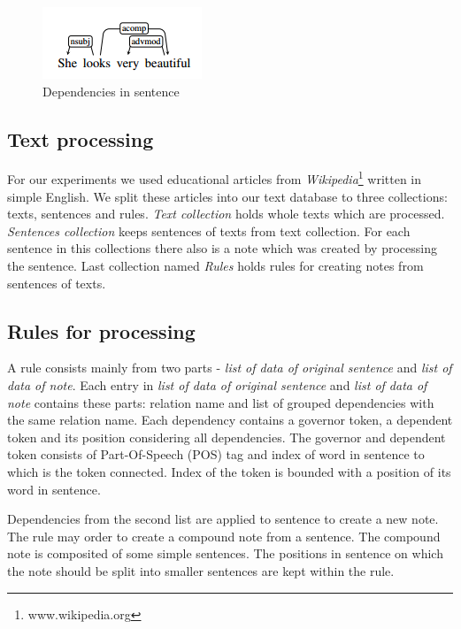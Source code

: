 \documentclass{iitsrc}
\begin{document}
		\begin{figure}[h]
			\begin{center}
				\includegraphics[scale=0.9]{dependencies_in_sentence}
				\caption{Dependencies in sentence~\cite{StanfordDepManual}}
				\label{fig:dependencies_in_sentence}
			\end{center}
		\end{figure}
	
	\subsection{Text processing} \label{sub:data_collection}
		For our experiments we used educational articles from \textit{Wikipedia}\footnote{www.wikipedia.org} written in simple English.	We split these articles into our text database to three collections: texts, sentences and rules. \textit{Text collection} holds whole texts which are processed. \textit{Sentences collection} keeps sentences of texts from text collection. For each sentence in this collections there also is a note which was created by processing the sentence. Last collection named \textit{Rules} holds rules for creating notes from sentences of texts.
	
	\subsection{Rules for processing}	\label{rule}
		A rule consists mainly from two parts - \textit{list of data of original sentence} and \textit{list of data of note}. Each entry in \textit{list of data of original sentence} and \textit{list of data of note} contains these parts: relation name and list of grouped dependencies with the same relation name. Each dependency contains a governor token, a dependent token and its position considering all dependencies. The governor and dependent token consists of Part-Of-Speech (POS) tag and index of word in sentence to which is the token connected. Index of the token is bounded with a position of its word in sentence.
		
		Dependencies from the second list are applied to sentence to create a new note. The rule may order to create a compound note from a sentence. The compound note is composited of some simple sentences. The positions in sentence on which the note should be split into smaller sentences are kept within the rule. \\
		
\end{document}

